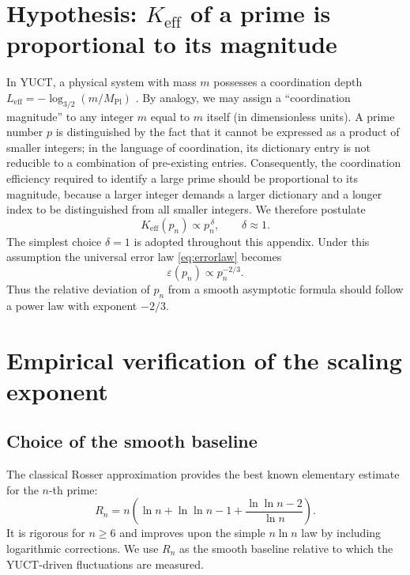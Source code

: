 \documentclass[12pt,a4paper]{article}
\begin{document}
	\section{Hypothesis: \(K_{\mathrm{eff}}\) of a prime is proportional to its magnitude}
	In YUCT, a physical system with mass \(m\) possesses a coordination depth \(L_{\mathrm{eff}} = -\log_{3/2}(m/M_{\mathrm{Pl}})\) \cite{YakushevLaw2026}. By analogy, we may assign a ``coordination magnitude'' to any integer \(m\) equal to \(m\) itself (in dimensionless units). A prime number \(p\) is distinguished by the fact that it cannot be expressed as a product of smaller integers; in the language of coordination, its dictionary entry is not reducible to a combination of pre-existing entries. Consequently, the coordination efficiency required to identify a large prime should be proportional to its magnitude, because a larger integer demands a larger dictionary and a longer index to be distinguished from all smaller integers. We therefore postulate
	\begin{equation}\label{eq:Keff-prime}
		K_{\mathrm{eff}}(p_n) \propto p_n^{\,\delta}, \qquad \delta \approx 1.
	\end{equation}
	The simplest choice \(\delta = 1\) is adopted throughout this appendix. Under this assumption the universal error law \eqref{eq:errorlaw} becomes
	\begin{equation}\label{eq:error-prime}
		\varepsilon(p_n) \propto p_n^{-2/3}.
	\end{equation}
	Thus the relative deviation of \(p_n\) from a smooth asymptotic formula should follow a power law with exponent \(-2/3\).
	
	\section{Empirical verification of the scaling exponent}
	\subsection{Choice of the smooth baseline}
	The classical Rosser approximation \cite{Rosser1941} provides the best known elementary estimate for the \(n\)-th prime:
	\begin{equation}\label{eq:rosser}
		R_n = n\!\left(\ln n + \ln\ln n - 1 + \frac{\ln\ln n - 2}{\ln n}\right).
	\end{equation}
	It is rigorous for \(n \ge 6\) and improves upon the simple \(n\ln n\) law by including logarithmic corrections. We use \(R_n\) as the smooth baseline relative to which the YUCT-driven fluctuations are measured.
	
\end{document}
